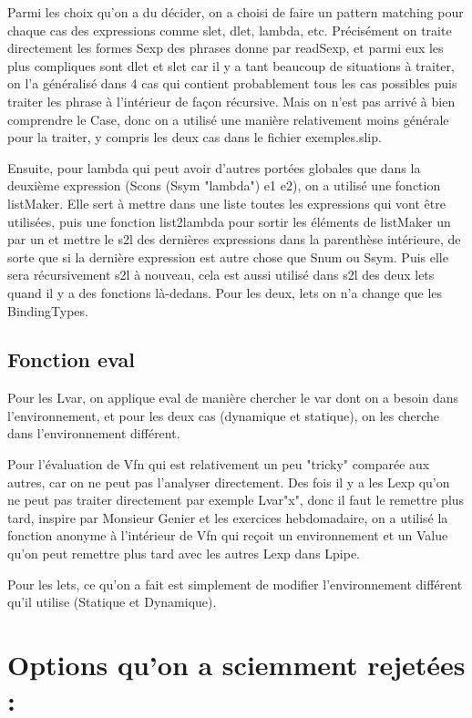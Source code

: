 \documentclass{article}
\begin{document}
Parmi les choix qu'on a du décider, on a choisi de faire un pattern matching pour chaque cas des expressions comme slet, dlet, lambda, etc. Précisément on traite directement les formes Sexp des phrases donne par readSexp, et parmi eux les plus compliques sont dlet et slet car il y a tant beaucoup de situations à traiter, on l'a généralisé dans 4 cas qui contient probablement tous les cas possibles puis traiter les phrase à l'intérieur de façon récursive. Mais on n'est pas arrivé à bien comprendre le Case, donc on a utilisé une manière relativement moins générale pour la traiter, y compris les deux cas dans le fichier exemples.slip.

Ensuite, pour lambda qui peut avoir d'autres portées globales que dans la deuxième expression (Scons (Ssym "lambda") e1 e2), on a utilisé une fonction listMaker. Elle sert à mettre dans une liste toutes les expressions qui vont être utilisées, puis une fonction list2lambda pour sortir les éléments de listMaker un par un et mettre le s2l des dernières expressions dans la parenthèse intérieure, de sorte que si la dernière expression est autre chose que Snum ou Ssym. Puis elle sera récursivement s2l à nouveau, cela est aussi utilisé dans s2l des deux lets quand il y a des fonctions là-dedans. Pour les deux, lets on n'a change que les BindingTypes.
\subsection{Fonction eval}


Pour les Lvar, on applique eval de manière chercher le var dont on a besoin dans l'environnement, et pour les deux cas (dynamique et statique), on les cherche dans l'environnement différent.

Pour l'évaluation de Vfn qui est relativement un peu "tricky" comparée aux autres, car on ne peut pas l'analyser directement. Des fois il y a les Lexp qu'on ne peut pas traiter directement par exemple Lvar"x", donc il faut le remettre plus tard, inspire par Monsieur Genier et les exercices hebdomadaire, on a utilisé la fonction anonyme à l'intérieur de Vfn qui reçoit un environnement et un Value qu'on peut remettre plus tard avec les autres Lexp dans Lpipe. 

Pour les lets, ce qu'on a fait est simplement de modifier l'environnement différent qu'il utilise (Statique et Dynamique).

\newpage
\section{Options qu’on a sciemment rejetées :}
\vspace{0.5cm}
\end{document}
